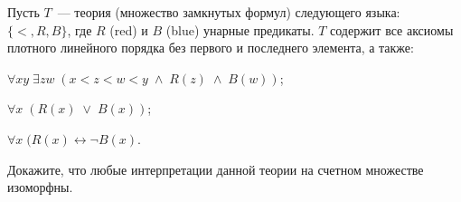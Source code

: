 Пусть $T$~--- теория (множество замкнутых формул) следующего языка: $\{<, R, B\}$, где $R$ (red) и $B$ (blue) унарные
предикаты. $T$ содержит все аксиомы плотного линейного порядка без первого и последнего элемента, а также:
\begin{itemtask}
	\item $\forall xy \; \exists zw \; (x < z < w < y \; \wedge \; R(z) \; \wedge \; B(w))$;
    \item $\forall x \; (R(x)\; \vee \; B(x))$;
    \item $\forall x \; (R(x) \leftrightarrow \neg B(x)$.
\end{itemtask}

Докажите, что любые интерпретации данной теории на счетном множестве изоморфны.